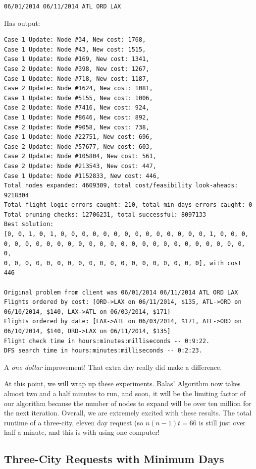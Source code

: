 \documentclass{article}
\begin{document}
\begin{verbatim}
06/01/2014 06/11/2014 ATL ORD LAX
\end{verbatim}

Has output:

\scriptsize
\begin{verbatim}
Case 1 Update: Node #34, New cost: 1768, 
Case 1 Update: Node #43, New cost: 1515, 
Case 1 Update: Node #169, New cost: 1341, 
Case 2 Update: Node #398, New cost: 1267, 
Case 1 Update: Node #718, New cost: 1187, 
Case 2 Update: Node #1624, New cost: 1081, 
Case 1 Update: Node #5155, New cost: 1006, 
Case 2 Update: Node #7416, New cost: 924, 
Case 1 Update: Node #8646, New cost: 892, 
Case 2 Update: Node #9058, New cost: 738, 
Case 1 Update: Node #22751, New cost: 696, 
Case 2 Update: Node #57677, New cost: 603, 
Case 2 Update: Node #105804, New cost: 561, 
Case 2 Update: Node #213543, New cost: 447, 
Case 1 Update: Node #1152833, New cost: 446, 
Total nodes expanded: 4609309, total cost/feasibility look-aheads: 9218304
Total flight logic errors caught: 210, total min-days errors caught: 0
Total pruning checks: 12706231, total successful: 8097133
Best solution:
[0, 0, 1, 0, 1, 0, 0, 0, 0, 0, 0, 0, 0, 0, 0, 0, 0, 0, 0, 1, 0, 0, 0,
0, 0, 0, 0, 0, 0, 0, 0, 0, 0, 0, 0, 0, 0, 0, 0, 0, 0, 0, 0, 0, 0, 0, 0,
0, 0, 0, 0, 0, 0, 0, 0, 0, 0, 0, 0, 0, 0, 0, 0, 0, 0, 0], with cost 446

Original problem from client was 06/01/2014 06/11/2014 ATL ORD LAX
Flights ordered by cost: [ORD->LAX on 06/11/2014, $135, ATL->ORD on 06/10/2014, $140, LAX->ATL on 06/03/2014, $171]
Flights ordered by date: [LAX->ATL on 06/03/2014, $171, ATL->ORD on 06/10/2014, $140, ORD->LAX on 06/11/2014, $135]
Flight check time in hours:minutes:milliseconds -- 0:9:22.
DFS search time in hours:minutes:milliseconds -- 0:2:23.
\end{verbatim}
\normalsize

A \emph{one dollar} improvement! That extra day really did make a difference.

At this point, we will wrap up these experiments. Balas' Algorithm now takes almost two and a half minutes to run, and soon, it will be the limiting
factor of our algorithm because the number of nodes to expand will be over ten million for the next iteration. Overall, we are extremely excited with
these results.  The total runtime of a three-city, eleven day request (so $n(n-1)t = 66$ is still just over half a minute, and this is with using one
computer!

\subsection{Three-City Requests with Minimum Days}
\end{document}
